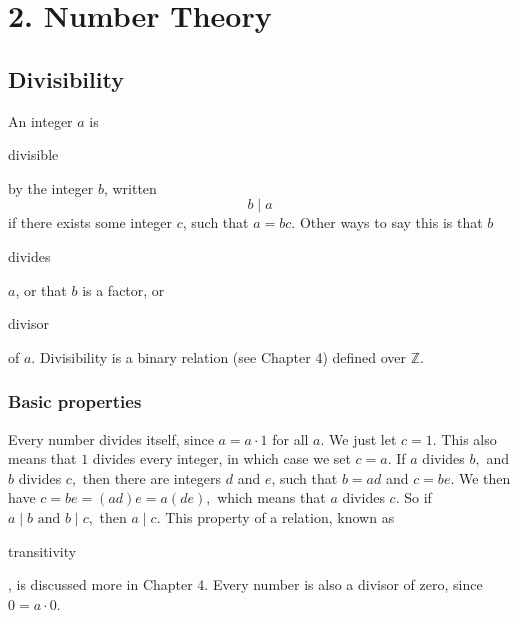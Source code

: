 \documentclass[11pt]{article}
\theoremstyle{plain}
\theoremstyle{definition}
\begin{document}
\section*{2. Number Theory}

\subsection*{Divisibility}

An integer $a$ is \begin{em}divisible\end{em} by the integer $b$, written
$$b \mid a$$
if there exists some integer $c$, such that $ a = bc. $ Other ways to say this is that $b$ \begin{em}divides\end{em} $a$, or that $b$ is a factor, or \begin{em}divisor\end{em} of $a$. Divisibility is a binary relation (see Chapter 4) defined over $\mathbb{Z}$.

\subsubsection*{Basic properties}


Every number divides itself, since $a = a \cdot 1$ for all $a$. We just let $c = 1.$ This also means that $1$ divides every integer, in which case we set $c = a$. If $a$ divides $b,$ and $b$ divides $c,$ then there are integers $d$ and $e$, such that $b = ad$ and $c = be$. We then have $c = be = (ad)e = a(de),$ which means that $a$ divides $c.$ So if $a \mid b \text{ and } b \mid c,$ then $a \mid c.$ This property of a relation, known as \begin{em}transitivity\end{em}, is discussed more in Chapter 4. Every number is also a divisor of zero, since $0 = a \cdot 0$.

%




\end{document}
